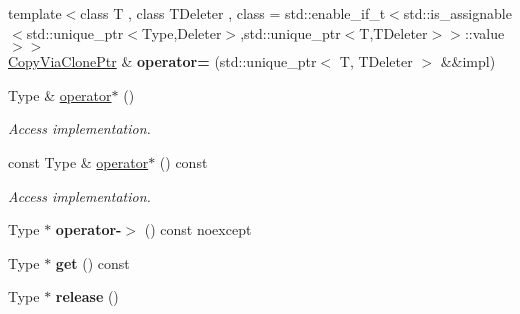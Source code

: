 \begin{DoxyCompactItemize}
\item 
\hypertarget{classSpacy_1_1CopyViaClonePtr_a24348da67745d11bd2aa866440208631}{}{\footnotesize template$<$class T , class T\+Deleter , class  = std\+::enable\+\_\+if\+\_\+t$<$std\+::is\+\_\+assignable$<$std\+::unique\+\_\+ptr$<$\+Type,\+Deleter$>$,std\+::unique\+\_\+ptr$<$\+T,\+T\+Deleter$>$$>$\+::value$>$$>$ }\\\hyperlink{classSpacy_1_1CopyViaClonePtr}{Copy\+Via\+Clone\+Ptr} \& {\bfseries operator=} (std\+::unique\+\_\+ptr$<$ T, T\+Deleter $>$ \&\&impl)\label{classSpacy_1_1CopyViaClonePtr_a24348da67745d11bd2aa866440208631}

\item 
\hypertarget{classSpacy_1_1CopyViaClonePtr_a800d25dc6a38152a5556874179247b7f}{}Type \& \hyperlink{classSpacy_1_1CopyViaClonePtr_a800d25dc6a38152a5556874179247b7f}{operator$\ast$} ()\label{classSpacy_1_1CopyViaClonePtr_a800d25dc6a38152a5556874179247b7f}

\begin{DoxyCompactList}\small\item\em Access implementation. \end{DoxyCompactList}\item 
\hypertarget{classSpacy_1_1CopyViaClonePtr_aa877c126564b39906502146e39f53c6c}{}const Type \& \hyperlink{classSpacy_1_1CopyViaClonePtr_aa877c126564b39906502146e39f53c6c}{operator$\ast$} () const \label{classSpacy_1_1CopyViaClonePtr_aa877c126564b39906502146e39f53c6c}

\begin{DoxyCompactList}\small\item\em Access implementation. \end{DoxyCompactList}\item 
\hypertarget{classSpacy_1_1CopyViaClonePtr_a2f95205b8508be896ae7fd84f7784c3d}{}Type $\ast$ {\bfseries operator-\/$>$} () const noexcept\label{classSpacy_1_1CopyViaClonePtr_a2f95205b8508be896ae7fd84f7784c3d}

\item 
\hypertarget{classSpacy_1_1CopyViaClonePtr_a09dee6ce0d5a4154d481d348045c80d9}{}Type $\ast$ {\bfseries get} () const \label{classSpacy_1_1CopyViaClonePtr_a09dee6ce0d5a4154d481d348045c80d9}

\item 
\hypertarget{classSpacy_1_1CopyViaClonePtr_a62fa5b206ca02050e10b77c0ba1db67b}{}Type $\ast$ {\bfseries release} ()\label{classSpacy_1_1CopyViaClonePtr_a62fa5b206ca02050e10b77c0ba1db67b}


\end{DoxyCompactItemize}
